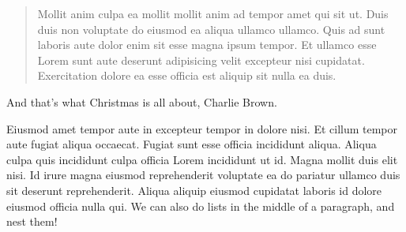 \documentclass[
    12pt,
    letterpaper,
    oneside,
    noraggedright
]{turabian-researchpaper}
\begin{document}
\begin{quote}
Mollit anim culpa ea mollit mollit anim ad tempor amet qui sit ut. Duis
duis non voluptate do eiusmod ea aliqua ullamco ullamco. Quis ad sunt
laboris aute dolor enim sit esse magna ipsum tempor. Et ullamco esse
Lorem sunt aute deserunt adipisicing velit excepteur nisi cupidatat.
Exercitation dolore ea esse officia est aliquip sit nulla ea duis.
\end{quote}

\noindent And that's what Christmas is all about, Charlie Brown.

Eiusmod amet tempor aute in excepteur tempor in dolore nisi. Et cillum
tempor aute fugiat aliqua occaecat. Fugiat sunt esse officia incididunt
aliqua. Aliqua culpa quis incididunt culpa officia Lorem incididunt ut
id. Magna mollit duis elit nisi. Id irure magna eiusmod reprehenderit
voluptate ea do pariatur ullamco duis sit deserunt reprehenderit. Aliqua
aliquip eiusmod cupidatat laboris id dolore eiusmod officia nulla qui.
We can also do lists in the middle of a paragraph, and nest them!
\end{document}
